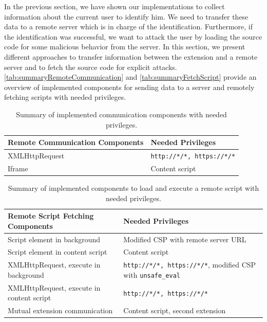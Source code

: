 	In the previous section, we have shown our implementations to collect information about the current user to identify him. We need to transfer these data to a remote server which is in charge of the identification. Furthermore, if the identification was successful, we want to attack the user by loading the source code for some malicious behavior from the server. In this section, we present different approaches to transfer information between the extension and a remote server and to fetch the source code for explicit attacks. \autoref{tab:summaryRemoteCommunication} and \autoref{tab:summaryFetchScript} provide an overview of implemented components for sending data to a server and remotely fetching scripts with needed privileges.
	
	\begin{table}[h]
		\centering
		\begin{tabular}{|l|l|} \hline
			\textbf{Remote Communication Components} & \textbf{Needed Privileges} \\ \hline
			XMLHttpRequest & \texttt{http://*/*, https://*/*}  \\
			Iframe & Content script \\	
			\hline
		\end{tabular}
		\caption{Summary of implemented communication components with needed privileges.}
		\label{tab:summaryRemoteCommunication}
	\end{table}
	
	\begin{table}[h]
		\centering
		\begin{tabular}{|l|l|} \hline
			\textbf{Remote Script Fetching Components} & \textbf{Needed Privileges} \\ \hline
			Script element in background & Modified CSP with remote server URL \\
			Script element in content script & Content script \\
			XMLHttpRequest, execute in background & \texttt{http://*/*, https://*/*}, modified CSP with \texttt{unsafe\_eval} \\
			XMLHttpRequest, execute in content script & \texttt{http://*/*, https://*/*}  \\
			Mutual extension communication & Content script, second extension \\ 
			\hline
		\end{tabular}
		\caption{Summary of implemented components to load and execute a remote script with needed privileges.}
		\label{tab:summaryFetchScript}
	\end{table}
	

